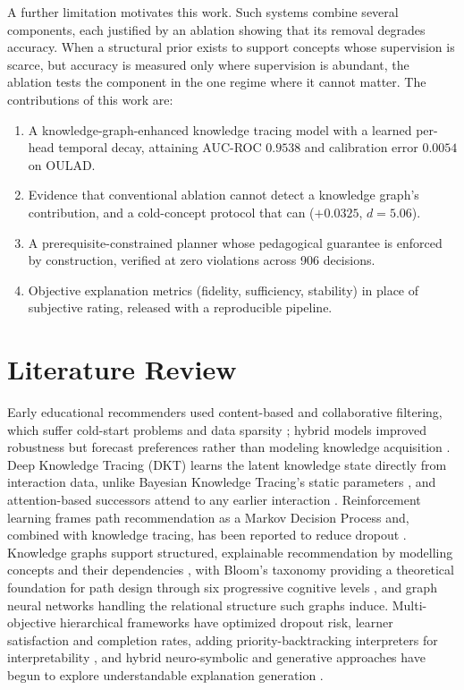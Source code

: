 \documentclass[conference]{IEEEtran}
\begin{document}
A further limitation motivates this work. Such systems combine several components, each
justified by an ablation showing that its removal degrades accuracy. When a structural prior
exists to support concepts whose supervision is scarce, but accuracy is measured only where
supervision is abundant, the ablation tests the component in the one regime where it cannot
matter. The contributions of this work are:

\begin{enumerate}
\item A knowledge-graph-enhanced knowledge tracing model with a learned per-head temporal
decay, attaining AUC-ROC $0.9538$ and calibration error $0.0054$ on OULAD.
\item Evidence that conventional ablation cannot detect a knowledge graph's contribution,
and a cold-concept protocol that can ($+0.0325$, $d = 5.06$).
\item A prerequisite-constrained planner whose pedagogical guarantee is enforced by
construction, verified at zero violations across 906 decisions.
\item Objective explanation metrics (fidelity, sufficiency, stability) in place of
subjective rating, released with a reproducible pipeline.
\end{enumerate}

\section{Literature Review}
\label{sec:lit}

Early educational recommenders used content-based and collaborative filtering, which
suffer cold-start problems and data sparsity \cite{li2026survey}\cite{aher2013combination};
hybrid models improved robustness but forecast preferences rather than modeling knowledge
acquisition \cite{corbett1994knowledge}. Deep Knowledge Tracing (DKT) \cite{piech2015dkt}
learns the latent knowledge state directly from interaction data, unlike Bayesian Knowledge
Tracing's static parameters \cite{zhang2017dkvmn}, and attention-based successors
\cite{pandey2019sakt, ghosh2020akt} attend to any earlier interaction
\cite{vaswani2017attention}. Reinforcement learning frames path recommendation as a Markov
Decision Process and, combined with knowledge tracing, has been reported to reduce dropout
\cite{shen2021lpkt, zhao2026rlkt}. Knowledge graphs support structured, explainable
recommendation by modelling concepts and their dependencies \cite{kipf2017gcn,
zhang2023finegrained}, with Bloom's taxonomy providing a theoretical foundation for path
design through six progressive cognitive levels \cite{khosravi2022xaied}, and graph neural
networks handling the relational structure such graphs induce. Multi-objective hierarchical
frameworks have optimized dropout risk, learner satisfaction and completion rates, adding
priority-backtracking interpreters for interpretability \cite{lundberg2017shap}
\cite{ribeiro2016lime}, and hybrid neuro-symbolic and generative approaches have begun to
explore understandable explanation generation \cite{yang2025explainable}.
\end{document}
